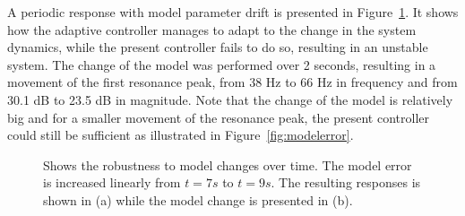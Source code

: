 A periodic response with model parameter drift is presented in Figure~\ref{fig:modeldrift}. It shows how the adaptive controller manages to adapt to the change in the system dynamics, while the present controller fails to do so, resulting in an unstable system. The change of the model was performed over 2 seconds, resulting in a movement of the first resonance peak, from 38 Hz to 66 Hz in frequency and from 30.1 dB to 23.5 dB in magnitude. Note that the change of the model is relatively big and for a smaller movement of the resonance peak, the present controller could still be sufficient as illustrated in Figure~\ref{fig:modelerror}.
\begin{figure}[h!]
  \centering %
  \qquad
  \caption{\label{fig:modeldrift} Shows the robustness to model changes over time. The model error is increased linearly from $t=7s$ to $t=9s$. The resulting responses is shown in (a) while the model change is presented in (b).}
\end{figure}


